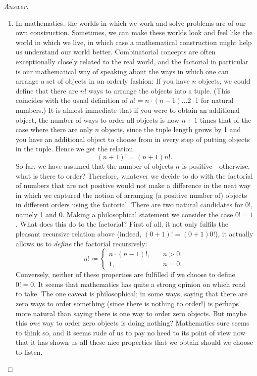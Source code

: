 \begin{proof}[Answer]
\hfill

\begin{enumerate}[wide]
\item In mathematics, the worlds in which we work and solve problems are of our own construction. Sometimes, we can make these worlds look and feel like the world in which we live, in which case a mathematical construction might help us understand our world better. Combinatorial concepts are often exceptionally closely related to the real world, and the factorial in particular is our mathematical way of speaking about the ways in which one can arrange a set of objects in an orderly fashion: If you have $n$ objects, we could define that there are $n!$ ways to arrange the objects into a tuple. (This coincides with the usual definition of $n! = n\cdot(n-1)\ldots 2 \cdot 1$ for natural numbers.) It is almost immediate that if you were to obtain an additional object, the number of ways to order all objects is now $n+1$ times that of the case where there are only $n$ objects, since the tuple length grows by 1 and you have an additional object to choose from in every step of putting objects in the tuple. Hence we get the relation
\[
(n+1)! = (n+1)n!.
\]
So far, we have assumed that the number of objects $n$ is positive - otherwise, what is there to order? Therefore, whatever we decide to do with the factorial of numbers that are not positive would not make a difference in the neat way in which we captured the notion of arranging (a positive number of) objects in different orders using the factorial. There are two natural candidates for $0!$, namely 1 and 0. Making a philosophical statement we consider the case $0! = 1$. What does this do to the factorial? First of all, it not only fulfils the pleasant recursive relation above (indeed, $(0 + 1)! = (0+1)0!$), it actually allows us to \textit{define} the factorial recursively:
\[
n! \coloneqq
\begin{cases}
n\cdot(n-1)!, &\quad n > 0, \\
1, &\quad n = 0.
\end{cases}
\]
Conversely, neither of these properties are fulfilled if we choose to define $0! = 0$. It seems that mathematics has quite a strong opinion on which road to take. The one caveat is philosophical; in some ways, saying that there are zero ways to order something (since there is nothing to order!) is perhaps more natural than saying there is one way to order zero objects. But maybe this \textit{one} way to order zero objects is doing nothing? Mathematics sure seems to think so, and it seems rude of us to pay no heed to its point of view now that it has shown us all these nice properties that we obtain should we choose to listen.


\end{enumerate}
\end{proof}
